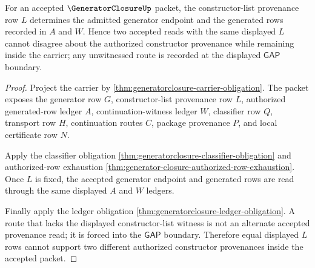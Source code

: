 \begin{theorem}
\label{thm:generator-closure-constructor-provenance-determinacy}
For an accepted $\GeneratorClosureUp$ packet, the constructor-list provenance row $L$ determines the admitted generator endpoint and the generated rows recorded in $A$ and $W$. Hence two accepted reads with the same displayed $L$ cannot disagree about the authorized constructor provenance while remaining inside the carrier; any unwitnessed route is recorded at the displayed $\mathsf{GAP}$ boundary.
\end{theorem}
\begin{proof}
Project the carrier by \autoref{thm:generatorclosure-carrier-obligation}. The packet exposes the generator row $G$, constructor-list provenance row $L$, authorized generated-row ledger $A$, continuation-witness ledger $W$, classifier row $Q$, transport row $H$, continuation routes $C$, package provenance $P$, and local certificate row $N$.

Apply the classifier obligation \autoref{thm:generatorclosure-classifier-obligation} and authorized-row exhaustion \autoref{thm:generator-closure-authorized-row-exhaustion}. Once $L$ is fixed, the accepted generator endpoint and generated rows are read through the same displayed $A$ and $W$ ledgers.

Finally apply the ledger obligation \autoref{thm:generatorclosure-ledger-obligation}. A route that lacks the displayed constructor-list witness is not an alternate accepted provenance read; it is forced into the $\mathsf{GAP}$ boundary. Therefore equal displayed $L$ rows cannot support two different authorized constructor provenances inside the accepted packet.
\end{proof}


